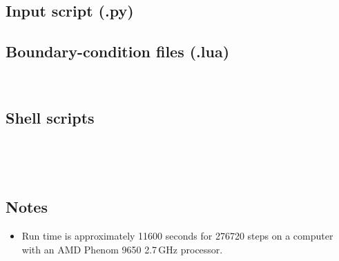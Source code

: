 \subsection{Input script (.py)}
\topbar

\bottombar


\subsection{Boundary-condition files (.lua)}
\topbar

\bottombar \\
\topbar

\bottombar


\subsection{Shell scripts}
\label{turbo-sc10-sh-files}
\topbar

\bottombar \\
\topbar

\bottombar \\
\topbar

\bottombar

\subsection{Notes}
\begin{itemize}
\item Run time is approximately 11600 seconds for 276720 steps on a computer with 
      an AMD Phenom 9650 2.7\,GHz processor.
\end{itemize}
